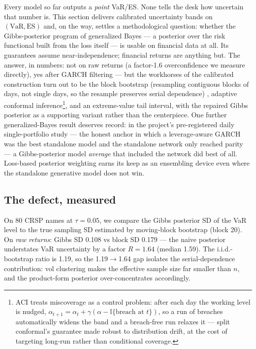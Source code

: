 \documentclass[11pt]{article}
\newcommand{\VaR}{\mathrm{VaR}}
\newcommand{\ES}{\mathrm{ES}}
\theoremstyle{remark}
\begin{document}
\medskip
Every model so far outputs a \emph{point} VaR/ES. None tells the desk
how uncertain that number is. This section delivers calibrated
uncertainty bands on $(\VaR,\ES)$ and, on the way, settles a
methodological question: whether the Gibbs-posterior program of
generalized Bayes \citep{jiang2008gibbs, bissiri2016general} --- a
posterior over the risk functional built from the loss itself --- is
usable on financial data at all. Its guarantees assume
near-independence; financial returns are anything but. The answer, in
numbers: not on raw returns (a factor-1.6 overconfidence we measure
directly), yes after GARCH filtering --- but the workhorses of the
calibrated construction turn out to be the block bootstrap (resampling
contiguous blocks of days, not single days, so the resample preserves
serial dependence) \citep{kunsch1989block}, adaptive conformal
inference\footnote{ACI \citep{gibbs2021aci} treats miscoverage as a
control problem: after each day the working level is nudged,
$\alpha_{t+1} = \alpha_t + \gamma(\alpha - \mathbb{I}\{\text{breach at }
t\})$, so a run of breaches automatically widens the band and a
breach-free run relaxes it --- split conformal's guarantee made robust
to distribution drift, at the cost of targeting long-run rather than
conditional coverage.}, and an extreme-value tail interval, with the
repaired Gibbs posterior as a supporting variant rather than the
centerpiece. One further generalized-Bayes result deserves record: in
the project's pre-registered daily single-portfolio study --- the honest
anchor in which a leverage-aware GARCH was the best standalone model and
the standalone network only reached parity --- a Gibbs-posterior model
\emph{average} that included the network did best of all. Loss-based
posterior weighting earns its keep as an ensembling device even where
the standalone generative model does not win.

\subsection{The defect, measured}

On 80 CRSP names at $\tau = 0.05$, we compare the Gibbs posterior SD of
the VaR level to the true sampling SD estimated by moving-block
bootstrap (block 20). On \emph{raw returns}: Gibbs SD 0.108 vs block SD
0.179 --- the naive posterior understates VaR uncertainty by a factor
$R = 1.64$ (median 1.59). The i.i.d.-bootstrap ratio is 1.19, so the
1.19$\to$1.64 gap isolates the serial-dependence contribution: vol
clustering makes the effective sample size far smaller than $n$, and the
product-form posterior over-concentrates accordingly.
\end{document}
